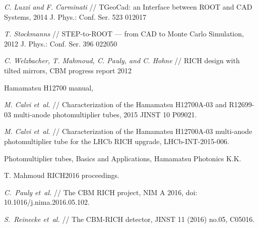 \begin{thebibliography}{99}
\textit{C. Luzzi and F. Carminati} //
TGeoCad: an Interface between ROOT and CAD Systems,
2014 J. Phys.: Conf. Ser. 523 012017


\textit{T. Stockmanns} //
STEP-to-ROOT --- from CAD to Monte Carlo Simulation,
2012 J. Phys.: Conf. Ser. 396 022050

\textit{C. Welzbacher, T. Mahmoud, C. Pauly, and C. Hohne} //
RICH design with tilted mirrors,
CBM progress report 2012


Hamamatsu H12700 manual,

\textit{M. Calvi et~al.} //
Characterization of the Hamamatsu H12700A-03 and R12699-03 multi-anode photomultiplier tubes,
2015 JINST 10 P09021.

\textit{M. Calvi et~al.} //
Characterization of the Hamamatsu H12700A-03 multi-anode photomultiplier tube for the LHCb RICH upgrade,
LHCb-INT-2015-006.



Photomultiplier tubes, Basics and Applications, Hamamatsu Photonics K.K.

T. Mahmoud RICH2016 proceedings.

\textit{C.~Pauly et~al.} //
The CBM RICH project,
NIM A 2016,
doi: 10.1016/j.nima.2016.05.102.

\textit{S.~Reinecke et~al.} //
The CBM-RICH detector,
JINST 11 (2016) no.05, C05016.


\end{thebibliography}
